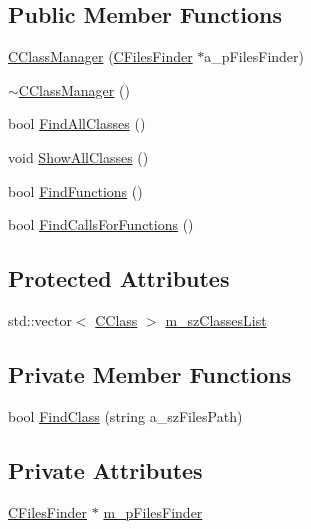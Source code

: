 \subsection*{Public Member Functions}
\begin{DoxyCompactItemize}
\item 
\hyperlink{class_c_class_manager_a3c3a80c00e5cf6c1698d5d4ee694db5c}{C\+Class\+Manager} (\hyperlink{class_c_files_finder}{C\+Files\+Finder} $\ast$a\+\_\+p\+Files\+Finder)
\item 
\hyperlink{class_c_class_manager_adac08f657e5d8965166a561f58e13b7d}{$\sim$\+C\+Class\+Manager} ()
\item 
bool \hyperlink{class_c_class_manager_a6fe927748562e26c60da40b7b54a35c8}{Find\+All\+Classes} ()
\item 
void \hyperlink{class_c_class_manager_a7a5bd390df1b4100f452d56f94cadf24}{Show\+All\+Classes} ()
\item 
bool \hyperlink{class_c_class_manager_a1df8fae08901fc20f20e7f7f5120d267}{Find\+Functions} ()
\item 
bool \hyperlink{class_c_class_manager_a7a44afac10c69c87860c65040b23b57a}{Find\+Calls\+For\+Functions} ()
\end{DoxyCompactItemize}
\subsection*{Protected Attributes}
\begin{DoxyCompactItemize}
\item 
std\+::vector$<$ \hyperlink{class_c_class}{C\+Class} $>$ \hyperlink{class_c_class_manager_acbcada64d77a7fa05c8c6ffadcf730db}{m\+\_\+sz\+Classes\+List}
\end{DoxyCompactItemize}
\subsection*{Private Member Functions}
\begin{DoxyCompactItemize}
\item 
bool \hyperlink{class_c_class_manager_a1db9b102548bc1b9becf44031d5c3937}{Find\+Class} (string a\+\_\+sz\+Files\+Path)
\end{DoxyCompactItemize}
\subsection*{Private Attributes}
\begin{DoxyCompactItemize}
\item 
\hyperlink{class_c_files_finder}{C\+Files\+Finder} $\ast$ \hyperlink{class_c_class_manager_a6ea255cab18dff35dd07390af7776675}{m\+\_\+p\+Files\+Finder}
\end{DoxyCompactItemize}


